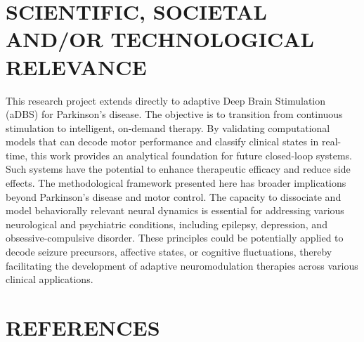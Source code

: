 \documentclass[12pt, letterpaper]{article}
\begin{document}
\newpage

\section{SCIENTIFIC, SOCIETAL AND/OR TECHNOLOGICAL RELEVANCE}

This research project extends directly to adaptive Deep Brain Stimulation (aDBS) for Parkinson's disease. The objective is to transition from continuous stimulation to intelligent, on-demand therapy. By validating computational models that can decode motor performance and classify clinical states in real-time, this work provides an analytical foundation for future closed-loop systems. Such systems have the potential to enhance therapeutic efficacy and reduce side effects. The methodological framework presented here has broader implications beyond Parkinson's disease and motor control. The capacity to dissociate and model behaviorally relevant neural dynamics is essential for addressing various neurological and psychiatric conditions, including epilepsy, depression, and obsessive-compulsive disorder. These principles could be potentially applied to decode seizure precursors, affective states, or cognitive fluctuations, thereby facilitating the development of adaptive neuromodulation therapies across various clinical applications.
\section{REFERENCES}
\printbibliography[heading=none]
\end{document}

